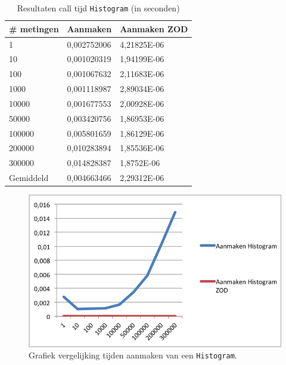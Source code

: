 \begin{table}[]
\centering
\begin{tabular}{|l|l|l|}
\hline
\# metingen & Aanmaken    & Aanmaken ZOD \\ \hline
1           & 0,002752006 & 4,21825E-06  \\ \hline
10          & 0,001020319 & 1,94199E-06  \\ \hline
100         & 0,001067632 & 2,11683E-06  \\ \hline
1000        & 0,001118987 & 2,89034E-06  \\ \hline
10000       & 0,001677553 & 2,00928E-06  \\ \hline
50000       & 0,003420756 & 1,86953E-06  \\ \hline
100000      & 0,005801659 & 1,86129E-06  \\ \hline
200000      & 0,010283894 & 1,85536E-06  \\ \hline
300000      & 0,014828387 & 1,8752E-06   \\ \hline
Gemiddeld   & 0,004663466 & 2,29312E-06  \\ \hline
\end{tabular}
\caption{Resultaten call tijd \texttt{Histogram} (in seconden)}
\label{Table:Histogram}
\end{table}

\begin{figure}[!h]
  \centering
  \includegraphics[scale=1.0]{Afbeeldingen/Evaluatie/AanmakenHistogram}
  \caption{Grafiek vergelijking tijden aanmaken van een \texttt{Histogram}.}
  \label{fig:GraphHistogram}
\end{figure}


